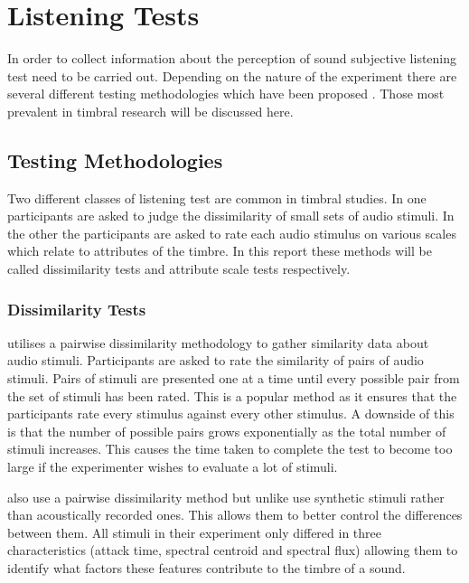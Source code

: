 \section{Listening Tests}
\label{sec:Timbre-ListeningTests}
	In order to collect information about the perception of sound subjective listening test need to be carried out.
	Depending on the nature of the experiment there are several different testing methodologies which have been proposed
	\citep{bech2006perceptual}. Those most prevalent in timbral research will be discussed here.

	\subsection{Testing Methodologies}
	\label{sec:Timbre-ListeningTests-Methods}
		Two different classes of listening test are common in timbral studies. In one participants are asked to
		judge the dissimilarity of small sets of audio stimuli. In the other the participants are asked to rate each
		audio stimulus on various scales which relate to attributes of the timbre. In this report these methods will
		be called dissimilarity tests and attribute scale tests respectively.

		\subsubsection*{Dissimilarity Tests}
			\citet{grey1977multidimensional} utilises a pairwise dissimilarity methodology to gather similarity
			data about audio stimuli. Participants are asked to rate the similarity of pairs of audio stimuli.
			Pairs of stimuli are presented one at a time until every possible pair from the set of stimuli has
			been rated. This is a popular method as it ensures that the participants rate every stimulus against
			every other stimulus. A downside of this is that the number of possible pairs grows exponentially as
			the total number of stimuli increases. This causes the time taken to complete the test to become too
			large if the experimenter wishes to evaluate a lot of stimuli.

			\citet{caclin2005acoustic} also use a pairwise dissimilarity method but unlike
			\citet{grey1977multidimensional} use synthetic stimuli rather than acoustically recorded ones. This
			allows them to better control the differences between them. All stimuli in their experiment only
			differed in three characteristics (attack time, spectral centroid and spectral flux) allowing them
			to identify what factors these features contribute to the timbre of a sound.

